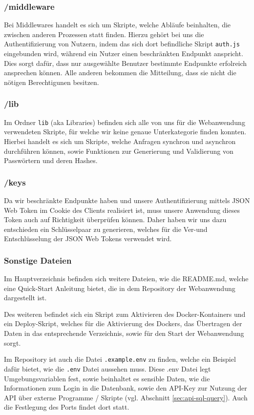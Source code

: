 \subsubsection*{/middleware}
Bei Middlewares handelt es sich um Skripte, welche Abläufe beinhalten, die zwischen anderen Prozessen statt finden.
Hierzu gehört bei uns die Authentifizierung von Nutzern, indem das sich dort befindliche Skript \verb|auth.js| eingebunden wird,
während ein Nutzer einen beschränkten Endpunkt anspricht. Dies sorgt dafür, dass nur ausgewählte Benutzer bestimmte Endpunkte
erfolreich ansprechen können. Alle anderen bekommen die Mitteilung, dass sie nicht die nötigen Berechtigunen besitzen.

\subsubsection*{/lib}
Im Ordner \verb|lib| (aka Libraries) befinden sich alle von uns für die Webanwendung verwendeten Skripte, für welche wir keine genaue
Unterkategorie finden konnten. Hierbei handelt es sich um Skripte, welche Anfragen synchron und asynchron durchführen können,
sowie Funktionen zur Generierung und Validierung von Passwörtern und deren Hashes.

\subsubsection*{/keys}
Da wir beschränkte Endpunkte haben und unsere Authentifizierung mittels JSON Web Token im Cookie des Clients realisiert ist,
muss unsere Anwendung dieses Token auch auf Richtigkeit überprüfen können. Daher haben wir uns dazu entschieden ein Schlüsselpaar
zu generieren, welches für die Ver-und Entschlüsselung der JSON Web Tokens verwendet wird.

\subsubsection*{Sonstige Dateien}
\label{sec:node-other-files}
Im Hauptverzeichnis befinden sich weitere Dateien, wie die README.md, welche eine Quick-Start Anleitung bietet, die in
dem Repository der Webanwendung dargestellt ist.

Des weiteren befindet sich ein Skript zum Aktivieren des Docker-Kontainers und ein Deploy-Skript, welches
für die Aktivierung des Dockers, das Übertragen der Daten in das entsprechende Verzeichnis, sowie für den Start der
Webanwendung sorgt.

Im Repository ist auch die Datei \verb|.example.env| zu finden, welche ein Beispiel dafür bietet, wie die \verb|.env| Datei
aussehen muss. Diese .env Datei legt Umgebungsvariablen fest, sowie beinhaltet es sensible Daten, wie
die Informationen zum Login in die Datenbank, sowie den API-Key zur Nutzung der API über externe Programme / Skripte
(vgl. Abschnitt \ref{sec:api-sql-query}). Auch die Festlegung des Ports findet dort statt.


